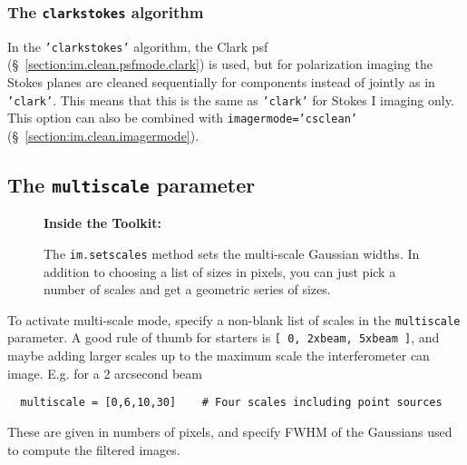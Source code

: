 \subsubsection{The {\tt clarkstokes} algorithm}
\label{section:im.clean.psfmode.clarkstokes}

In the {\tt 'clarkstokes'} algorithm, the Clark psf 
(\S~\ref{section:im.clean.psfmode.clark}) is used, but for 
polarization imaging the Stokes planes are cleaned sequentially for
components instead of jointly as in {\tt 'clark'}.  This means
that this is the same as {\tt 'clark'} for Stokes I imaging only.
This option can also be combined with {\tt imagermode='csclean'}
(\S~\ref{section:im.clean.imagermode}).

\subsection{The {\tt multiscale} parameter}
\label{section:im.clean.multiscale}


\begin{wrapfigure}{r}{2.5in}
  \begin{boxedminipage}{2.5in}
     \centerline{\bf Inside the Toolkit:}
     The {\tt im.setscales} method sets the multi-scale Gaussian
     widths.  In addition to choosing a list of sizes in pixels,
     you can just pick a number of scales and get a geometric series 
     of sizes.
  \end{boxedminipage}
\end{wrapfigure}

To activate multi-scale mode, specify a non-blank list of scales in
the {\tt multiscale} parameter.  A good rule of thumb for starters is
{\tt [ 0, 2xbeam, 5xbeam ]}, and maybe adding larger scales up to the
maximum scale the interferometer can image.  E.g. for a 2 arcsecond
beam \small
\begin{verbatim}
  multiscale = [0,6,10,30]    # Four scales including point sources
\end{verbatim}
\normalsize
These are given in numbers of pixels, and specify FWHM of the
Gaussians used to compute the filtered images.

